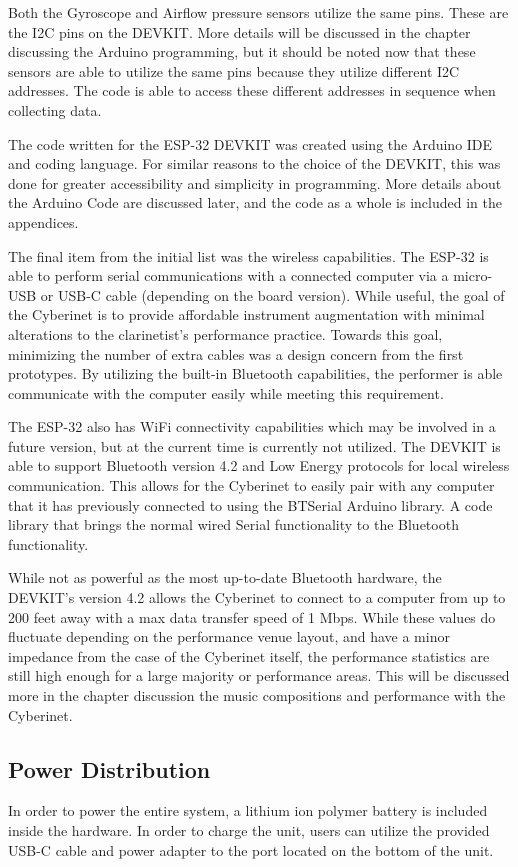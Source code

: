 Both the Gyroscope and Airflow pressure sensors utilize the same pins. These are the I2C pins on the DEVKIT. More details will be discussed in the chapter discussing the Arduino programming, but it should be noted now that these sensors are able to utilize the same pins because they utilize different I2C addresses. The code is able to access these different addresses in sequence when collecting data.

The code written for the ESP-32 DEVKIT was created using the Arduino IDE and coding language. For similar reasons to the choice of the DEVKIT, this was done for greater accessibility and simplicity in programming. More details about the Arduino Code are discussed later, and the code as a whole is included in the appendices.

The final item from the initial list was the wireless capabilities. The ESP-32 is able to perform serial communications with a connected computer via a micro-USB or USB-C cable (depending on the board version). While useful, the goal of the Cyberinet is to provide affordable instrument augmentation with minimal alterations to the clarinetist's performance practice. Towards this goal, minimizing the number of extra cables was a design concern from the first prototypes. By utilizing the built-in Bluetooth capabilities, the performer is able communicate with the computer easily while meeting this requirement.

The ESP-32 also has WiFi connectivity capabilities which may be involved in a future version, but at the current time is currently not utilized. The DEVKIT is able to support Bluetooth version 4.2 and Low Energy protocols for local wireless communication. This allows for the Cyberinet to easily pair with any computer that it has previously connected to using the BTSerial Arduino library. A code library that brings the normal wired Serial functionality to the Bluetooth functionality.

While not as powerful as the most up-to-date Bluetooth hardware, the DEVKIT's version 4.2 allows the Cyberinet to connect to a computer from up to 200 feet away with a max data transfer speed of 1 Mbps. While these values do fluctuate depending on the performance venue layout, and have a minor impedance from the case of the Cyberinet itself, the performance statistics are still high enough for a large majority or performance areas. This will be discussed more in the chapter discussion the music compositions and performance with the Cyberinet. 


\subsection{Power Distribution}
In order to power the entire system, a lithium ion polymer battery is included inside the hardware. In order to charge the unit, users can utilize the provided USB-C cable and power adapter to the port located on the bottom of the unit. %


